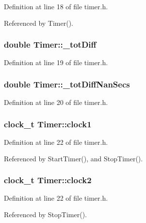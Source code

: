 Definition at line 18 of file timer.h.

Referenced by Timer().
\subsubsection{\setlength{\rightskip}{0pt plus 5cm}double {\bf Timer::\_\-totDiff}\hspace{0.3cm}{\tt  [private]}}\label{classTimer_ff38d0d636d6d1d70c26c81b1b22956b}




Definition at line 19 of file timer.h.
\subsubsection{\setlength{\rightskip}{0pt plus 5cm}double {\bf Timer::\_\-totDiffNanSecs}\hspace{0.3cm}{\tt  [private]}}\label{classTimer_cf7b601e65a944a9fd46df722f445039}




Definition at line 20 of file timer.h.
\subsubsection{\setlength{\rightskip}{0pt plus 5cm}clock\_\-t {\bf Timer::clock1}\hspace{0.3cm}{\tt  [private]}}\label{classTimer_3ae91f3d031faeb8401702ec8ceab51d}




Definition at line 22 of file timer.h.

Referenced by StartTimer(), and StopTimer().
\subsubsection{\setlength{\rightskip}{0pt plus 5cm}clock\_\-t {\bf Timer::clock2}\hspace{0.3cm}{\tt  [private]}}\label{classTimer_d29500007a671be2a0dbd230249fa5a9}




Definition at line 22 of file timer.h.

Referenced by StopTimer().
